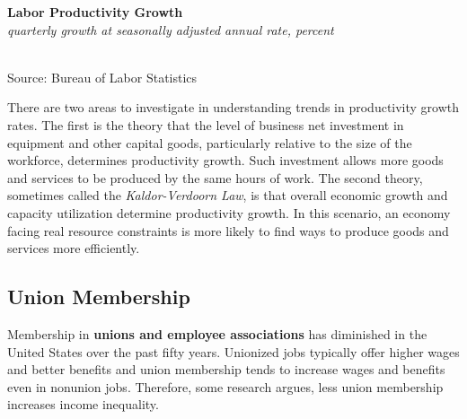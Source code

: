 \documentclass{report}
\makeatletter
\newcommand{\tbllink}[1]{\href{https://raw.githubusercontent.com/bdecon/US-chartbook/master/chartbook/data/#1}{\faTable}}
\newcommand*\short[1]{\expandafter\@gobbletwo\number\numexpr#1\relax}
\newcommand{\sbar}[4]{
		\addplot[ybar stacked, bar width=2.5pt, draw opacity=0, fill=#1] 
			table [x=#2, y=#3, col sep=comma]{#4};}
\newcommand{\dateaxisticks}{
		date coordinates in=x, axis line style={draw=none},
		xmax={2021-05-15},
		max space between ticks=40,	    
		xtick={{1990-01-01}, {1992-01-01}, {1994-01-01}, 
			{1996-01-01}, {1998-01-01}, {2000-01-01}, 
			{2002-01-01}, {2004-01-01}, {2006-01-01},
			{2008-01-01}, {2010-01-01}, {2012-01-01}, {2014-01-01},
		    {2016-01-01}, {2018-01-01}, {2020-01-01}},
		minor xtick={{1989-01-01}, {1991-01-01}, {1993-01-01},
			{1995-01-01}, {1997-01-01}, {1999-01-01}, 
			{2001-01-01}, {2003-01-01}, {2005-01-01}, {2007-01-01},
		    {2009-01-01}, {2011-01-01}, {2013-01-01}, {2015-01-01},
		    {2017-01-01}, {2019-01-01}, {2021-01-01}},
		enlarge y limits={0.06}, enlarge x limits={0.01},
		}
\newcommand{\bbar}[2]{extra #1 ticks = {{#2}}, extra #1 tick labels = ,
		extra #1 tick style = {grid=major, grid style={thick, black!25}},}
\newcommand{\rbars}{
		\fill[color=black!10] (axis cs:{1990-07-01},\pgfkeysvalueof{/pgfplots/ymin}) rectangle 
			(axis cs:{1991-03-01}, \pgfkeysvalueof{/pgfplots/ymax});
		\fill[color=black!10] (axis cs:{2007-12-01},\pgfkeysvalueof{/pgfplots/ymin}) rectangle 
			(axis cs:{2009-07-01}, \pgfkeysvalueof{/pgfplots/ymax});
		\fill[color=black!10] (axis cs:{2001-03-01},\pgfkeysvalueof{/pgfplots/ymin}) rectangle 
			(axis cs:{2001-11-01}, \pgfkeysvalueof{/pgfplots/ymax});
		\fill[color=black!10] (axis cs:{2020-02-01},\pgfkeysvalueof{/pgfplots/ymin}) rectangle 
			(axis cs:{2021-05-15}, \pgfkeysvalueof{/pgfplots/ymax});}
\makeatother
\begin{document}
{{\begin{minipage}{0.76\textwidth}

\vspace{3mm}

\normalsize \textbf{Labor Productivity Growth}\\
\footnotesize{\textit{quarterly growth at seasonally adjusted annual rate, percent}}\\
\hspace*{-2mm} \\
\footnotesize{Source: Bureau of Labor Statistics} \hfill \tbllink{lprod.csv}
\vspace{3mm}

\small There are two areas to investigate in understanding trends in productivity growth rates. The first is the theory that the level of business net investment in equipment and other capital goods, particularly relative to the size of the workforce, determines productivity growth. Such investment allows more goods and services to be produced by the same hours of work. The second theory, sometimes called the \textit{Kaldor-Verdoorn Law}, is that overall economic growth and capacity utilization determine productivity growth. In this scenario, an economy facing real resource constraints is more likely to find ways to produce goods and services more efficiently.
\end{minipage}
\newpage
\begin{minipage}{0.76\textwidth}
\subsection*{\color{black!70} \seriffont Union Membership}
\small Membership in \textbf{unions and employee associations} has diminished in the United States over the past fifty years. Unionized jobs typically offer higher wages and better benefits and union membership tends to increase wages and benefits even in nonunion jobs. Therefore, some research argues, less union membership increases income inequality. 


\vspace{3mm}


\end{minipage}}}
\end{document}
